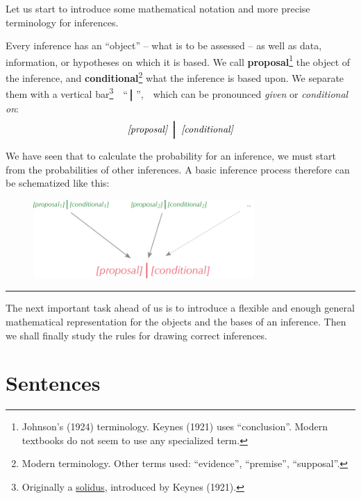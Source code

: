 \documentclass[
  a4paper,
  DIV=11,
  numbers=noendperiod,
  oneside]{scrreprt}
\begin{document}
Let us start to introduce some mathematical notation and more precise
terminology for inferences.

Every inference has an ``object'' -- what is to be assessed -- as well
as data, information, or hypotheses on which it is based. We call
{\textbf{proposal}}\footnote{Johnson's (1924) terminology. Keynes (1921)
  uses ``conclusion''. Modern textbooks do not seem to use any
  specialized term.} the object of the inference, and
{\textbf{conditional}}\footnote{Modern terminology. Other terms used:
  ``evidence'', ``premise'', ``supposal''.} what the inference is based
upon. We separate them with a vertical
bar\footnote{Originally a
  \href{https://dictionary.cambridge.org/dictionary/english/solidus}{solidus},
  introduced by Keynes (1921).}~~{``\(\pmb{\nonscript\:\big\vert\nonscript\:\mathopen{}}\)'',}~~which
can be pronounced \emph{given} or \emph{conditional on}: \[
\textit{[proposal]}\ \pmb{\nonscript\:\Big\vert\nonscript\:\mathopen{}}\ 
\textit{[conditional]}
\]

We have seen that to calculate the probability for an inference, we must
start from the probabilities of other inferences. A basic inference
process therefore can be schematized like this:

\begin{figure}

{\centering \includegraphics[width=0.75\textwidth,height=\textheight]{basic_inference_red.png}

}

\end{figure}

\hfill\break

\begin{center}\rule{0.5\linewidth}{0.5pt}\end{center}

The next important task ahead of us is to introduce a flexible and
enough general mathematical representation for the objects and the bases
of an inference. Then we shall finally study the rules for drawing
correct inferences.

\hypertarget{sentences}{%
\chapter{Sentences}\label{sentences}}
\end{document}
